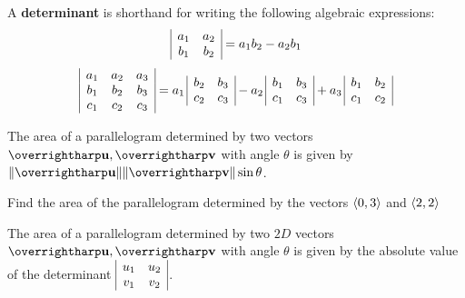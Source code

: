 \documentclass[letterpaper, twoside, 12pt]{book}
\begin{document}
\begin{definition}
  A \textbf{determinant} is shorthand for writing the following
  algebraic expressions:
    \[
      \begin{array}{|c c|}
      a_1 & a_2 \\
      b_1 & b_2 \\
      \end{array}
        =
      a_1b_2 - a_2b_1
    \]
    \[
      \begin{array}{|c c c|}
      a_1 & a_2 & a_3 \\
      b_1 & b_2 & b_3 \\
      c_1 & c_2 & c_3 \\
      \end{array}
        =
      a_1 \,
      \begin{array}{|c c|}
      b_2 & b_3 \\
      c_2 & c_3 \\
      \end{array}
        -
      a_2 \,
      \begin{array}{|c c|}
      b_1 & b_3 \\
      c_1 & c_3 \\
      \end{array}
        +
      a_3 \,
      \begin{array}{|c c|}
      b_1 & b_2 \\
      c_1 & c_2 \\
      \end{array}
    \]
\end{definition}

\begin{theorem}
  The area of a parallelogram determined by two
  vectors \(\harpvec u,\harpvec v\) with angle \(\theta\) is given by
  \(
    \|\harpvec u\|\|\harpvec v\|\sin\theta
  \).
\end{theorem}

\begin{problem}
  Find the area of the parallelogram determined by the vectors
  \(\langle0,3\rangle\) and \(\langle2,2\rangle\)
\end{problem}

\begin{theorem}
  The area of a parallelogram determined by two \(2D\)
  vectors \(\harpvec u,\harpvec v\) with angle \(\theta\) is given by
  the absolute value of the determinant
  \(
    \begin{array}{|c c|}
    u_1 & u_2 \\
    v_1 & v_2 \\
    \end{array}
  \).
\end{theorem}
\end{document}
